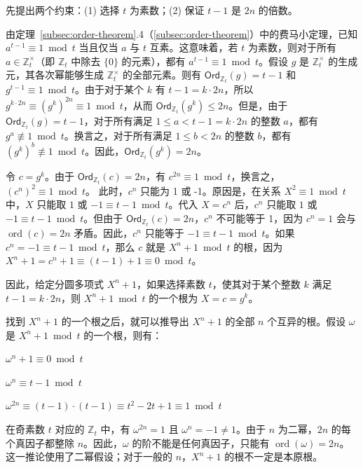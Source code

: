 先提出两个约束：(1) 选择 $t$ 为素数；(2) 保证 $t-1$ 是 $2n$ 的倍数。

由定理~\ref*{subsec:order-theorem}.4（\autoref{subsec:order-theorem}）中的费马小定理，已知 $a^{t - 1} \equiv 1 \bmod t$ 当且仅当 $a$ 与 $t$ 互素。这意味着，若 $t$ 为素数，则对于所有 $a \in \mathbb{Z}_t^{\times}$（即 $\mathbb{Z}_t$ 中除去 $\{0\}$ 的元素），都有 $a^{t - 1} \equiv 1 \bmod t$。假设 $g$ 是 $\mathbb{Z}_t^{\times}$ 的生成元，其各次幂能够生成 $\mathbb{Z}_t^{\times}$ 的全部元素。则有 $\textsf{Ord}_{\mathbb{Z}_t}(g) = t - 1$ 和 $g^{t - 1} \equiv 1 \bmod t$。由于对于某个 $k$ 有 $t - 1 = k \cdot 2n$，所以 $g^{k\cdot2n} \equiv (g^{k})^{2n} \equiv 1 \bmod t$，从而 $\textsf{Ord}_{\mathbb{Z}_t}(g^{k}) \leq 2n$。但是，由于 $\textsf{Ord}_{\mathbb{Z}_t}(g) = t - 1$，对于所有满足 $1\le a < t - 1 = k \cdot 2n$ 的整数 $a$，都有 $g^a \not\equiv 1 \bmod t$。换言之，对于所有满足 $1\le b < 2n$ 的整数 $b$，都有 $(g^k)^b \not\equiv 1 \bmod t$。因此，$\textsf{Ord}_{\mathbb{Z}_t}(g^{k}) = 2n$。

令 $c = g^k$。由于 $\textsf{Ord}_{\mathbb{Z}_t}(c) = 2n$，有 $c^{2n} \equiv 1 \bmod t$，换言之，$(c^n)^2 \equiv 1 \bmod t$。
此时，$c^n$ 只能为 1 或 -1。原因是，在关系 $X^2 \equiv 1 \bmod t$ 中，$X$ 只能取 $1$ 或 $-1 \equiv t - 1 \bmod t$。代入 $X = c^n$ 后，$c^n$ 只能取 $1$ 或 $-1 \equiv t - 1 \bmod t$。但由于 $\textsf{Ord}_{\mathbb{Z}_t}(c) = 2n$，$c^n$ 不可能等于 1，因为 $c^n=1$ 会与 $\operatorname{ord}(c)=2n$ 矛盾。因此，$c^n$ 只能等于 $-1 \equiv t - 1 \bmod t$。如果 $c^n = -1 \equiv t - 1 \bmod t$，那么 $c$ 就是 $X^n + 1 \bmod t$ 的根，因为 $X^n + 1 = c^n + 1 \equiv (t - 1) + 1 \equiv 0 \bmod t$。

因此，给定分圆多项式 $X^n + 1$，如果选择素数 $t$，使其对于某个整数 $k$ 满足 $t - 1 = k \cdot 2n$，则 $X^n + 1 \bmod t$ 的一个根为 $X = c = g^k$。

找到 $X^n + 1$ 的一个根之后，就可以推导出 $X^n + 1$ 的全部 $n$ 个互异的根。假设 $\omega$ 是 $X^n + 1 \bmod t$ 的一个根，则有：

$\omega^n + 1 \equiv 0 \bmod t$

$\omega^n \equiv t - 1 \bmod t$

$\omega^{2n} \equiv (t - 1)\cdot(t - 1) \equiv  t^2 - 2t + 1 \equiv   1 \bmod t$

在奇素数 $t$ 对应的 $\mathbb Z_t$ 中，有 $\omega^{2n}=1$ 且 $\omega^n=-1\ne1$。由于 $n$ 为二幂，$2n$ 的每个真因子都整除 $n$。因此，$\omega$ 的阶不能是任何真因子，只能有 $\operatorname{ord}(\omega)=2n$。这一推论使用了二幂假设；对于一般的 $n$，$X^n+1$ 的根不一定是本原根。

